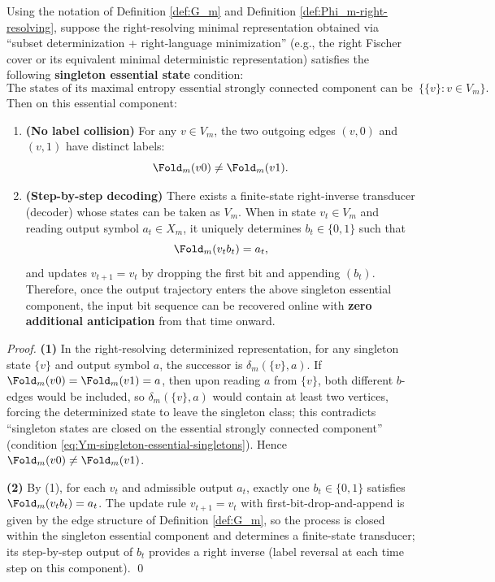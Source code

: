\begin{corollary}[Singleton Essential States \texorpdfstring{$\Rightarrow$}{=>} Finite-Delay Right Decoding]\label{cor:Ym-singleton-essential-finite-delay}
Using the notation of Definition \ref{def:G_m} and Definition \ref{def:Phi_m-right-resolving}, suppose the right-resolving minimal representation obtained via ``subset determinization + right-language minimization'' (e.g., the right Fischer cover or its equivalent minimal deterministic representation) satisfies the following \textbf{singleton essential state} condition:
\begin{equation}\label{eq:Ym-singleton-essential-singletons}
\text{The states of its maximal entropy essential strongly connected component can be identified as all singletons }\ \{\{v\}:v\in V_m\}.
\end{equation}
Then on this essential component:
\begin{enumerate}
  \item \textbf{(No label collision)} For any \(v\in V_m\), the two outgoing edges \((v,0)\) and \((v,1)\) have distinct labels:
  \[
  \Fold_m(v0)\neq \Fold_m(v1).
  \]
  \item \textbf{(Step-by-step decoding)} There exists a finite-state right-inverse transducer (decoder) whose states can be taken as \(V_m\). When in state \(v_t\in V_m\) and reading output symbol \(a_t\in X_m\), it uniquely determines \(b_t\in\{0,1\}\) such that
  \[
  \Fold_m(v_t b_t)=a_t,
  \]
  and updates \(v_{t+1}=v_t\) by dropping the first bit and appending \((b_t)\). Therefore, once the output trajectory enters the above singleton essential component, the input bit sequence can be recovered online with \textbf{zero additional anticipation} from that time onward.
\end{enumerate}
\end{corollary}
\begin{proof}
\textbf{(1)} In the right-resolving determinized representation, for any singleton state \(\{v\}\) and output symbol \(a\), the successor is
\(
\delta_m(\{v\},a)
\).
If \(\Fold_m(v0)=\Fold_m(v1)=a\), then upon reading \(a\) from \(\{v\}\), both different \(b\)-edges would be included, so
\(
\delta_m(\{v\},a)
\)
would contain at least two vertices, forcing the determinized state to leave the singleton class; this contradicts ``singleton states are closed on the essential strongly connected component'' (condition \eqref{eq:Ym-singleton-essential-singletons}). Hence \(\Fold_m(v0)\neq \Fold_m(v1)\).

\textbf{(2)} By (1), for each \(v_t\) and admissible output \(a_t\), exactly one \(b_t\in\{0,1\}\) satisfies \(\Fold_m(v_t b_t)=a_t\). The update rule \(v_{t+1}=v_t\) with first-bit-drop-and-append is given by the edge structure of Definition \ref{def:G_m}, so the process is closed within the singleton essential component and determines a finite-state transducer; its step-by-step output of \(b_t\) provides a right inverse (label reversal at each time step on this component). \qed
\end{proof}

